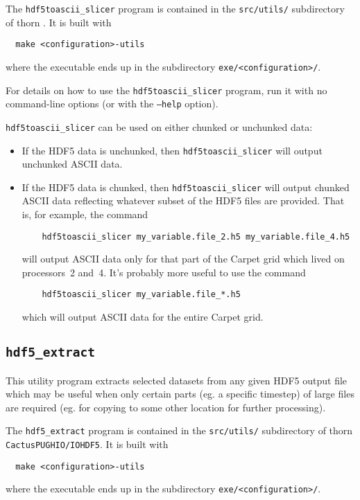 \documentclass{article}
\begin{document}
The {\tt hdf5toascii\_slicer} program is contained in the {\tt src/utils/}
subdirectory of thorn \ThisThorn. It is built with
\begin{verbatim}
  make <configuration>-utils
\end{verbatim}
where the executable ends up in the subdirectory {\tt exe/<configuration>/}.

For details on how to use the {\tt hdf5toascii\_slicer} program,
run it with no command-line options (or with the {\tt --help} option).

{\tt hdf5toascii\_slicer} can be used on either chunked or unchunked
data:
\begin{itemize}
\item	If the HDF5 data is unchunked, then {\tt hdf5toascii\_slicer}
	will output unchunked ASCII data.
\item	If the HDF5 data is chunked, then {\tt hdf5toascii\_slicer}
	will output chunked ASCII data reflecting whatever subset of
	the HDF5 files are provided.  That is, for example, the command
	\begin{verbatim}
	hdf5toascii_slicer my_variable.file_2.h5 my_variable.file_4.h5
	\end{verbatim}
	will output ASCII data only for that part of the Carpet grid
	which lived on processors~2 and~4.  It's probably more useful
	to use the command
	\begin{verbatim}
	hdf5toascii_slicer my_variable.file_*.h5
	\end{verbatim}
	which will output ASCII data for the entire Carpet grid.
\end{itemize}


\subsection{{\tt hdf5\_extract}}

This utility program extracts selected datasets from any given HDF5 output file
which may be useful when only certain parts (eg. a specific
timestep) of large files are required (eg. for copying to some other
location for further processing).

The {\tt hdf5\_extract} program is contained in the {\tt src/utils/}
subdirectory of thorn {\tt CactusPUGHIO/IOHDF5}. It is built with
\begin{verbatim}
  make <configuration>-utils
\end{verbatim}
where the executable ends up in the subdirectory {\tt exe/<configuration>/}.
\end{document}
